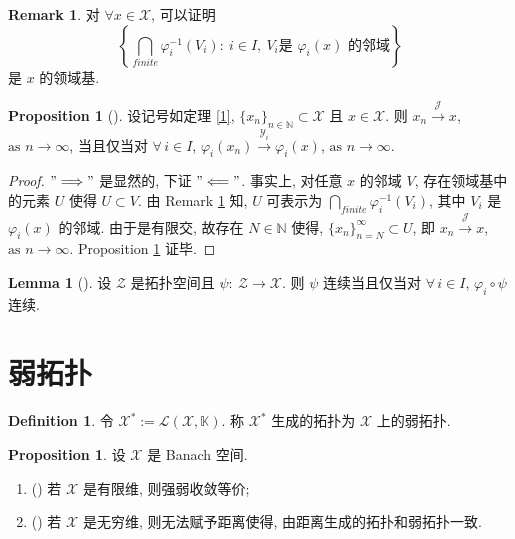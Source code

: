 \documentclass[a4paper,11pt]{article}
\theoremstyle{definition}
\newtheorem{lemma}[theorem]{Lemma}
\newtheorem{proposition}[theorem]{Proposition}
\newtheorem{remark}[theorem]{Remark}
\newtheorem{definition}[theorem]{Definition}
\begin{document}
\begin{remark} \label{2}
    对 $ \forall x \in \mathcal{X} $, 可以证明
    $$
        \left\{ \bigcap_{finite} \varphi_i^{-1}(V_i) :\ i \in I,\ V_i \text{是 } \varphi_i(x) \text{ 的邻域} \right\}
    $$
    是 $ x $ 的领域基.
\end{remark}

\begin{proposition}[{\cite[Proposition 3.1]{b11}}]  \label{3}
    设记号如定理 \ref{1}, 
    $ \{x_n\}_{n \in \mathbb{N}} \subset \mathcal{X} $ 且 $ x \in \mathcal{X} $.
    则 $ x_n \overset{\mathcal{J}}{\to} x $, $ \text{as } n \to \infty $,
    当且仅当对 $ \forall \, i \in I $, 
    $ \varphi_i(x_n) \overset{\mathcal{Y}_i}{\to} \varphi_i(x) $, $ \text{as } n \to \infty $.
\end{proposition}

\begin{proof}
    $"\Longrightarrow"$ 是显然的, 下证 $"\Longleftarrow"$. 
    事实上, 对任意 $ x $ 的邻域 $ V $, 存在领域基中的元素 $ U $ 使得 $ U \subset V $. 
    由 Remark \ref{2} 知, $ U $ 可表示为 $ \bigcap_{finite} \varphi_i^{-1}(V_i) $, 
    其中 $ V_i $ 是 $ \varphi_i(x) $ 的邻域. 由于是有限交, 
    故存在 $ N \in \mathbb{N} $ 使得, $ \{x_n\}_{n = N}^\infty \subset U $,
    即 $ x_n \overset{\mathcal{J}}{\to} x $, $ \text{as } n \to \infty $.
    Proposition \ref{3} 证毕.
\end{proof}

\begin{lemma} [{\cite[Proposition 3.1]{b11}}] 
    设 $ \mathcal{Z} $ 是拓扑空间且 $ \psi :\ \mathcal{Z} \to \mathcal{X} $.
    则 $ \psi $ 连续当且仅当对 $ \forall \, i \in I $, $ \varphi_i \circ \psi $ 连续.
\end{lemma}

\section{弱拓扑}

\begin{definition}
    令 $ \mathcal{X}^* := \mathcal{L}(\mathcal{X}, \mathbb{K}) $.
    称 $ \mathcal{X}^* $ 生成的拓扑为 $ \mathcal{X} $ 上的弱拓扑.
\end{definition}

\begin{proposition}
    设 $ \mathcal{X} $ 是 Banach 空间.
    \begin{enumerate}[{\rm(i)}]  
        \item (\cite[Proposition 3.6]{b11}) 若 $ \mathcal{X} $ 是有限维, 则强弱收敛等价;
        \item (\cite[Exercise 3.8]{b11}) 若 $ \mathcal{X} $ 是无穷维, 则无法赋予距离使得, 
            由距离生成的拓扑和弱拓扑一致.
    \end{enumerate}
\end{proposition}
\end{document}
